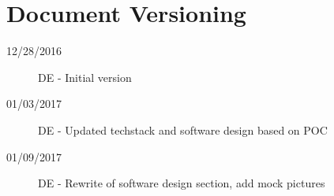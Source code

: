 \chapter*{Document Versioning}
\begin{description}
    \item[12/28/2016] DE - Initial version
    \item[01/03/2017] DE - Updated techstack and software design based on POC
    \item[01/09/2017] DE - Rewrite of software design section, add mock pictures
\end{description}